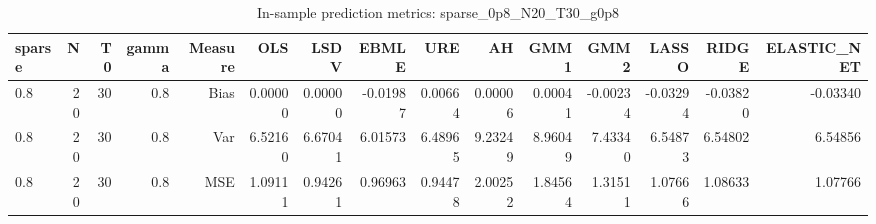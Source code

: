 \begin{table}[!htbp]\centering
\caption{In-sample prediction metrics: sparse_0p8_N20_T30_g0p8}
\label{tab:table2_sparse_0p8_N20_T30_g0p8}
\begin{tabular}{lrrrrrrrrrrrrrr}
\hline
sparse & N & T0 & gamma & Measure & OLS & LSDV & EBMLE & URE & AH & GMM1 & GMM2 & LASSO & RIDGE & ELASTIC_NET \\
\hline
0.8 & 20 & 30 & 0.8 & Bias & 0.00000 & 0.00000 & -0.01987 & 0.00664 & 0.00006 & 0.00041 & -0.00234 & -0.03294 & -0.03820 & -0.03340 \\
0.8 & 20 & 30 & 0.8 & Var & 6.52160 & 6.67041 & 6.01573 & 6.48965 & 9.23249 & 8.96049 & 7.43340 & 6.54873 & 6.54802 & 6.54856 \\
0.8 & 20 & 30 & 0.8 & MSE & 1.09111 & 0.94261 & 0.96963 & 0.94478 & 2.00252 & 1.84564 & 1.31511 & 1.07666 & 1.08633 & 1.07766 \\
\hline
\end{tabular}
\end{table}

